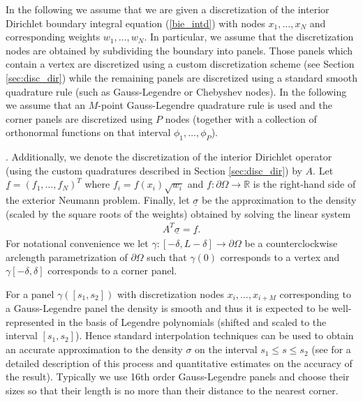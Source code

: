 In the following we assume that we are given a discretization of the interior Dirichlet boundary integral equation (\ref{bie_intd}) with nodes $x_1,\dots,x_N$ and corresponding weights $w_1,\dots,w_N.$ In particular, we assume that the discretization nodes are obtained by subdividing the boundary into panels. Those panels which contain a vertex are discretized using a custom discretization scheme (see Section \ref{sec:disc_dir}) while the remaining panels are discretized using a standard smooth quadrature rule (such as Gauss-Legendre or Chebyshev nodes). In the following we assume that an $M$-point Gauss-Legendre quadrature rule is used and the corner panels are discretized using $P$ nodes (together with a collection of orthonormal functions on that interval $\phi_1,\dots,\phi_P$).

. Additionally, we denote the discretization of the interior Dirichlet operator (using the custom quadratures described in Section \ref{sec:disc_dir}) by $A.$ Let $\underline{f} = (f_1,\dots,f_N)^T$ where $f_i = f(x_i) \sqrt{w_i}$ and $f: \partial \Omega \to \mathbb{R}$ is the right-hand side of the exterior Neumann problem. Finally, let $\underline{\sigma}$ be the approximation to the density (scaled by the square roots of the weights) obtained by solving the linear system
\begin{align}\label{eqn:adj_linalg}
A^T \underline{\sigma} = \underline{f}.
\end{align}
For notational convenience we let $\gamma:[-\delta,L-\delta] \to \partial \Omega$ be a counterclockwise arclength parametrization of $\partial \Omega$ such that  $\gamma(0)$ corresponds to a vertex and $\gamma[-\delta,\delta]$ corresponds to a corner panel.

For a panel $\gamma([s_1,s_2])$ with discretization nodes $x_i,\dots,x_{i+M}$ corresponding to a Gauss-Legendre panel the density is smooth and thus it is expected to be well-represented in the basis of Legendre polynomials (shifted and scaled to the interval $[s_1,s_2]$). Hence standard interpolation techniques can be used to obtain an accurate approximation to the density $\sigma$ on the interval $s_1 \le s\le s_2$ (see \cite{} for a detailed description of this process and quantitative estimates on the accuracy of the result). Typically we use 16th order Gauss-Legendre panels and choose their sizes so that their length is no more than their distance to the nearest corner.

